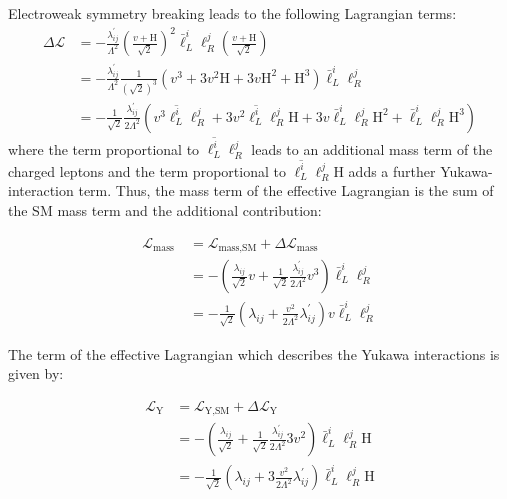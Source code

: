 Electroweak symmetry breaking leads to the following Lagrangian terms:
%
\begin{equation}
  \begin{aligned}
    \Delta \mathcal{L} &=-\frac{\lambda_{i j}^{\prime}}{\Lambda^2}(\frac{v+\text{H}}{\sqrt{2}})^2 \bar{\ell}_{L}^{i} \ell_{R}^{j}(\frac{v+\text{H}}{\sqrt{2}}) \\
    &=-\frac{\lambda_{i j}^{\prime}}{\Lambda^2} \frac{1}{(\sqrt{2})^{3}}(v^{3}+3 v^2 \text{H} + 3 v \text{H}^2 + \text{H}^{3}) \bar{\ell}_{L}^{i} \ell_{R}^{j} \\
    &=-\frac{1}{\sqrt{2}} \frac{\lambda_{i j}^{\prime}}{2 \Lambda^2}(v^{3} \overline{\ell_{L}^{i}} \ell_{R}^{j}+3 v^2 \overline{\ell_{L}^{i}} \ell_{R}^{j} \text{H} + 3 v \bar{\ell}_{L}^{i} \ell_{R}^{j} \text{H}^2+\bar{\ell}_{L}^{i} \ell_{R}^{j} \text{H}^{3})
  \end{aligned}
\end{equation}
%
where the term proportional to $\overline{\ell_{L}^{i}} \ell_{R}^{j}$ leads to an additional mass term of the charged leptons and the term proportional to $\overline{\ell_{L}^{i}} \ell_{R}^{j} \text{H}$ adds a further Yukawa-interaction term. Thus, the mass term of the effective Lagrangian is the sum of the SM mass term and the additional contribution:

\begin{equation}
  \begin{aligned}
    \mathcal{L}_{\text {mass }} &=\mathcal{L}_{\text {mass}, \text{SM}}+\Delta \mathcal{L}_{\text {mass }} \\
    &=-(\frac{\lambda_{i j}}{\sqrt{2}} v+\frac{1}{\sqrt{2}} \frac{\lambda_{i j}^{\prime}}{2 \Lambda^2} v^{3}) \bar{\ell}_{L}^{i} \ell_{R}^{j} \\
    &=-\frac{1}{\sqrt{2}}(\lambda_{i j}+\frac{v^2}{2 \Lambda^2} \lambda_{i j}^{\prime}) v \bar{\ell}_{L}^{i} \ell_{R}^{j}
  \end{aligned}
\end{equation}

The term of the effective Lagrangian which describes the Yukawa interactions is given by:

\begin{equation}
  \begin{aligned}
    \mathcal{L}_{\text{Y}} &=\mathcal{L}_{\text{Y}, \text{SM}}+\Delta \mathcal{L}_{\text{Y}} \\
    &=-(\frac{\lambda_{i j}}{\sqrt{2}}+\frac{1}{\sqrt{2}} \frac{\lambda_{i j}^{\prime}}{2 \Lambda^2} 3 v^2) \bar{\ell}_{L}^{i} \ell_{R}^{j} \text{H} \\
    &=-\frac{1}{\sqrt{2}}(\lambda_{i j}+3 \frac{v^2}{2 \Lambda^2} \lambda_{i j}^{\prime}) \bar{\ell}_{L}^{i} \ell_{R}^{j} \text{H}
  \end{aligned}
\end{equation}

